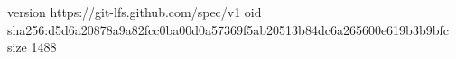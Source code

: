 version https://git-lfs.github.com/spec/v1
oid sha256:d5d6a20878a9a82fcc0ba00d0a57369f5ab20513b84dc6a265600e619b3b9bfc
size 1488
